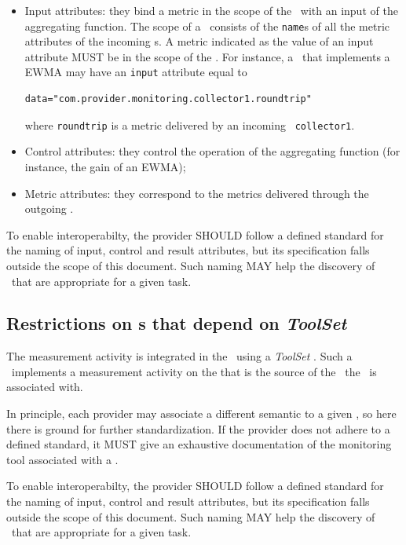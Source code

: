 \documentclass[12pt]{article}  %
\begin{document}
\begin{itemize}
\item Input attributes: they bind a metric in the scope of the \sens\ with an input of the aggregating function. The scope of a \sens\ consists of the {\tt name}s of all the metric attributes of the incoming \coll s. A metric indicated as the value of an input attribute MUST be in the scope of the \sens . For instance, a \sens\ that implements a EWMA may have an {\tt input} attribute equal to 
\begin{verbatim}
data="com.provider.monitoring.collector1.roundtrip"
\end{verbatim}
where \verb&roundtrip& is a metric delivered by an incoming \coll\ {\tt collector1}.
\item Control attributes: they control the operation of the aggregating function (for instance, the gain of an EWMA);
\item Metric attributes: they correspond to the metrics delivered through the outgoing \coll.
\end{itemize}

To enable interoperabilty, the provider SHOULD follow a defined standard for the naming of input, control and result attributes, but its specification falls outside the scope of this document. Such naming MAY help the discovery of \mi\ that are appropriate for a given task.


\subsection{Restrictions on \mi s that depend on {\em ToolSet} \label{sec:Tool}}

The measurement activity is integrated in the \coll\ using a {\em ToolSet} \mi . Such a \mi\ implements a measurement activity on the \rs that is the source of the \sens\ the \mi\ is associated with.

In principle, each provider may associate a different semantic to a given \mi, so here there is ground for further standardization. If the provider does not adhere to a defined standard, it MUST give an exhaustive documentation of the monitoring tool associated with a \mi.

To enable interoperabilty, the provider SHOULD follow a defined standard for the naming of input, control and result attributes, but its specification falls outside the scope of this document. Such naming MAY help the discovery of \mi\ that are appropriate for a given task.
\end{document}
